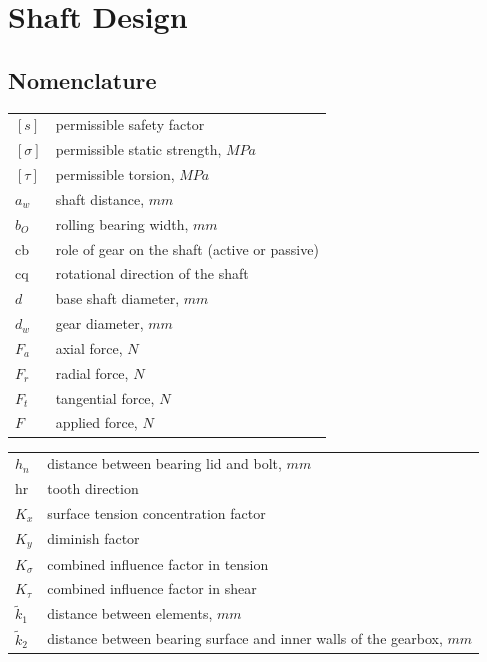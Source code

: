 \chapter{Shaft Design}
\section{Nomenclature}
\begin{tabular}[t]{lp{6.5cm}}
	$ [s] $ & permissible safety factor\\
	$ [\sigma] $ & permissible static strength, $ \unit{MPa} $\\
	$ [\tau] $ & permissible torsion, $ \unit{MPa} $\\
	$ a_w $ & shaft distance, $ \unit{mm} $\\
	$ b_O $ & rolling bearing width, $ \unit{mm}$\\
	$ \text{cb} $ & role of gear on the shaft (active or passive)\\
	$ \text{cq} $ & rotational direction of the shaft\\
	$ d $ & base shaft diameter, $ \unit{mm} $\\
	$ d_w $ & gear diameter, $ \unit{mm} $\\
	$ F_a $ & axial force, $ \unit{N} $\\
	$ F_r $ & radial force, $ \unit{N} $\\
	$ F_t $ & tangential force, $ \unit{N} $\\
	$ F $ & applied force, $ \unit{N} $\\	
\end{tabular}
\begin{tabular}[t]{lp{6.5cm}}
	$ h_n $ & distance between bearing lid and bolt, $ \unit{mm} $\\
	$ \text{hr} $ & tooth direction\\
	$ K_x $ & surface tension concentration factor\\
	$ K_y $ & diminish factor\\
	$ K_\sigma $ & combined influence factor in tension\\
	$ K_\tau $ & combined influence factor in shear\\
	$ \tilde{k}_1 $ & distance between elements, $ \unit{mm} $\\
	$ \tilde{k}_2 $ & distance between bearing surface and inner walls of the gearbox, $ \unit{mm} $\\
\end{tabular}\newpage
